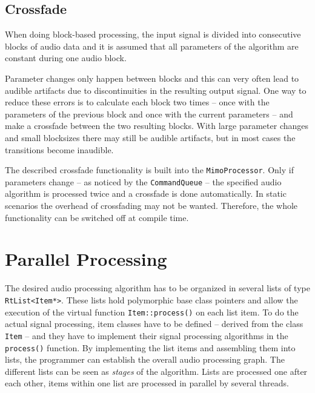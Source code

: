 \documentclass[11pt,letterpaper]{article}
\newcommand{\code}{\texttt}
\begin{document}
\subsection{Crossfade}

\label{sec:crossfade}

When doing block-based processing, the input signal is divided into consecutive
blocks of audio data and it is assumed that all parameters of the
algorithm are
constant during one audio block.

Parameter changes only happen between blocks and this can very often
lead to audible artifacts due to discontinuities in the resulting output signal.
One way to reduce these errors is to calculate each block two times -- once with
the parameters of the previous block and once with the current parameters -- and
make a crossfade between the two resulting blocks.
With large parameter changes and small blocksizes there may still be audible
artifacts, but in most cases the transitions become inaudible.

The described crossfade functionality is built into the \code{MimoProcessor}.
Only if parameters change -- as noticed by the \code{CommandQueue} -- the
specified audio algorithm is processed twice and a crossfade is done
automatically.
In static scenarios the overhead of crossfading may not be wanted. Therefore,
the whole functionality can be switched off at compile time.

\section{Parallel Processing}

\label{sec:parallel}

The desired audio processing algorithm has to be organized in several lists of type
\code{RtList<Item*>}.
These lists hold polymorphic base class pointers and allow the execution of
the virtual function \code{Item::process()} on each list item.
To do the actual signal processing,
item classes have to be defined -- derived from the class
\code{Item} -- and they have to implement their signal processing algorithms in the
\code{process()} function.
By implementing the list items and assembling them into lists, the programmer can
establish the overall audio processing graph.
The different lists can be seen as \emph{stages} of the algorithm. Lists are
processed one after each other, items within one list are processed in parallel
by several threads.
\end{document}
